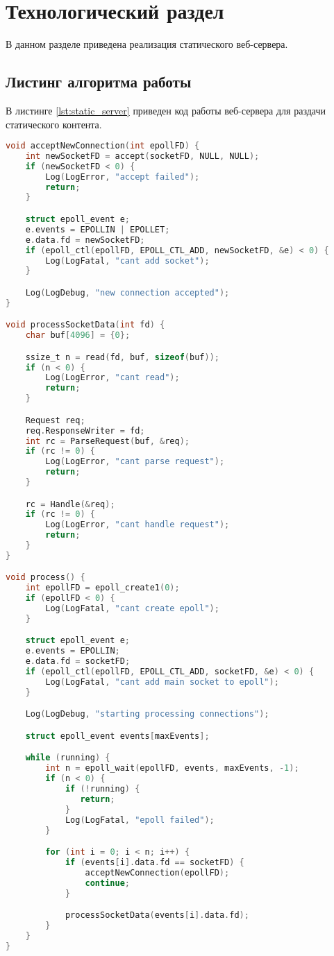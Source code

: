 \chapter{Технологический раздел}

В данном разделе приведена реализация статического веб-сервера.

\section{Листинг алгоритма работы}

В листинге \ref{lst:static_server} приведен код работы веб-сервера для раздачи статического контента.
 
\begin{lstlisting}[language=C, label=lst:static_server, caption={Листинг алгоритма работы веб-сервера для раздачи статического контента}]
void acceptNewConnection(int epollFD) {
    int newSocketFD = accept(socketFD, NULL, NULL);
    if (newSocketFD < 0) {
        Log(LogError, "accept failed");
        return;
    }

    struct epoll_event e;
    e.events = EPOLLIN | EPOLLET;
    e.data.fd = newSocketFD;
    if (epoll_ctl(epollFD, EPOLL_CTL_ADD, newSocketFD, &e) < 0) {
        Log(LogFatal, "cant add socket");
    }

    Log(LogDebug, "new connection accepted");
}

void processSocketData(int fd) {
    char buf[4096] = {0};

    ssize_t n = read(fd, buf, sizeof(buf));
    if (n < 0) {
        Log(LogError, "cant read");
        return;
    }

    Request req;
    req.ResponseWriter = fd;
    int rc = ParseRequest(buf, &req);
    if (rc != 0) {
        Log(LogError, "cant parse request");
        return;
    }

    rc = Handle(&req);
    if (rc != 0) {
        Log(LogError, "cant handle request");
        return;
    }
}

void process() {
    int epollFD = epoll_create1(0);
    if (epollFD < 0) {
        Log(LogFatal, "cant create epoll");
    }

    struct epoll_event e;
    e.events = EPOLLIN;
    e.data.fd = socketFD;
    if (epoll_ctl(epollFD, EPOLL_CTL_ADD, socketFD, &e) < 0) {
        Log(LogFatal, "cant add main socket to epoll");
    }

    Log(LogDebug, "starting processing connections");

    struct epoll_event events[maxEvents];

    while (running) {
        int n = epoll_wait(epollFD, events, maxEvents, -1);
        if (n < 0) {
            if (!running) {
               return;
            }
            Log(LogFatal, "epoll failed");
        }

        for (int i = 0; i < n; i++) {
            if (events[i].data.fd == socketFD) {
                acceptNewConnection(epollFD);
                continue;
            }

            processSocketData(events[i].data.fd);
        }
    }
}
\end{lstlisting}
